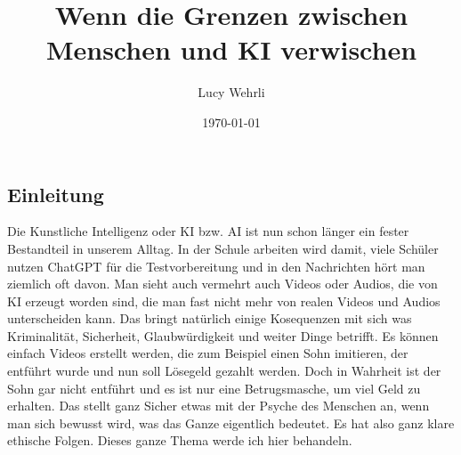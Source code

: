\documentclass{report}
\title{Wenn die Grenzen zwischen Menschen und KI verwischen}
\author{Lucy Wehrli}
\date{\today}
\begin{document}
\maketitle


\tableofcontents

\chapter{}
\section{ Einleitung}

Die Kunstliche Intelligenz oder KI bzw. AI ist nun schon länger ein fester Bestandteil in unserem Alltag. In der Schule arbeiten wird damit, viele Schüler nutzen ChatGPT für die Testvorbereitung und in den Nachrichten hört man ziemlich oft davon. Man sieht auch vermehrt auch Videos oder Audios, die von KI erzeugt worden sind, die man fast nicht mehr von realen Videos und Audios unterscheiden kann. Das bringt natürlich einige Kosequenzen mit sich was Kriminalität, Sicherheit, Glaubwürdigkeit und weiter Dinge betrifft. Es können einfach Videos erstellt werden, die zum Beispiel einen Sohn imitieren, der entführt wurde und nun soll Lösegeld gezahlt werden. Doch in Wahrheit ist der Sohn gar nicht entführt und es ist nur eine Betrugsmasche, um viel Geld zu erhalten. Das stellt ganz Sicher etwas mit der Psyche des Menschen an, wenn man sich bewusst wird, was das Ganze eigentlich bedeutet. Es hat also ganz klare ethische Folgen. Dieses ganze Thema werde ich hier behandeln.
\end{document}
